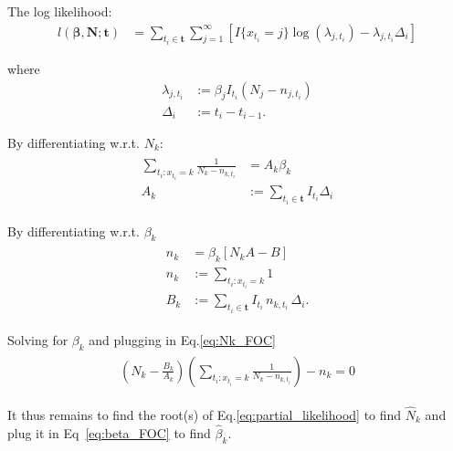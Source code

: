 \documentclass[12pt,a4paper,draft]{article}
\begin{document}
The log likelihood:
\begin{align*}
	l(\bm{\beta},\bm{N}; \bm{t}) &=
	\sum_{t_i \in \bm t} \sum_{j=1}^\infty \left[
		I\{ x_{t_i} = j \} \log(\lambda_{j,t_i}) -
		\lambda_{j,t_i} \Delta_i
	\right]	
\end{align*}

where 
\begin{align*}
	\lambda_{j,t_i} &:= \beta_j I_{t_i} (N_j-n_{j,t_i}) \\
	\Delta_i &:= t_i - t_{i-1}. 
\end{align*}

By differentiating w.r.t. $N_k$:
\begin{align}\label{eq:Nk_FOC}
\begin{split}
	\sum_{t_i:x_{t_i}=k} \frac{1}{N_k - n_{k,t_i}} &= A_k \beta_k \\
	A_k &:= \sum_{t_i \in \bm t} I_{t_i} \Delta_i
\end{split}
\end{align}

By differentiating w.r.t. $\beta_k$
\begin{align}\label{eq:beta_FOC}
\begin{split}
	n_k &= \beta_k [ N_k A- B ] \\
	n_k &:= \sum_{t_i:x_{t_i}=k} 1 \\
	B_k &:= \sum_{t_i \in \bm t} I_{t_i} \, n_{k,t_i} \, \Delta_i.
\end{split}
\end{align}

Solving for $\beta_k$ and plugging in Eq.\ref{eq:Nk_FOC}
\begin{align}\label{eq:partial_likelihood}
\begin{split}
	\left( N_k-\frac{B_k}{A_k} \right) 
	\left( \sum_{t_i:x_{t_i}=k}\frac{1}{N_k - n_{k,t_i}}\right) - n_{k}=0
\end{split}
\end{align}

It thus remains to find the root(s) of Eq.\ref{eq:partial_likelihood} to find $\hat{N}_k$ and plug it in Eq~\ref{eq:beta_FOC} to find $\hat{\beta}_k$.
\end{document}
